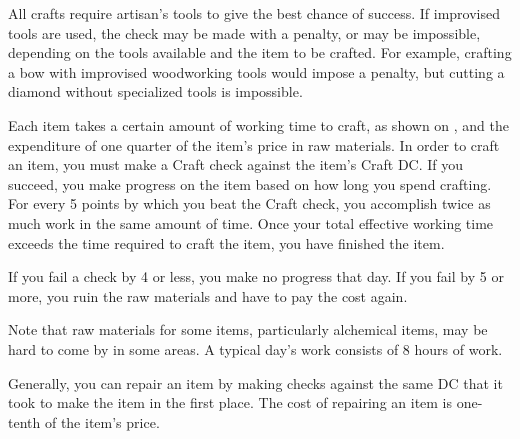 All crafts require artisan's tools to give the best chance of success. If improvised tools are used, the check may be made with a penalty, or may be impossible, depending on the tools available and the item to be crafted. For example, crafting a bow with improvised woodworking tools would impose a  penalty, but cutting a diamond without specialized tools is impossible.

\begin{comment}
To determine the time required to craft an item, consult the table below.
\begin{dtable*}
  \lcaption{Crafting Time}
  \begin{tabularx}{\columnwidth}{l X}
    \thead{Item Price} & \thead{Crafting Time} \\
    1gp or less & 1 hour per sp (minimum 1 hour) \\
    10gp or less & 1 day per 2 gp (minimum 1 day) \\
    100gp or less & 5 days \add 1 day per 4 gp \\
    1000gp or less & 30 days \add 1 day per 100 gp \\
  \end{tabularx}
\end{dtable*}
\end{comment}

Each item takes a certain amount of working time to craft, as shown on , and the expenditure of one quarter of the item's price in raw materials. In order to craft an item, you must make a Craft check against the item's Craft DC. If you succeed, you make progress on the item based on how long you spend crafting. For every 5 points by which you beat the Craft check, you accomplish twice as much work in the same amount of time. Once your total effective working time exceeds the time required to craft the item, you have finished the item.

If you fail a check by 4 or less, you make no progress that day. If you fail by 5 or more, you ruin the raw materials and have to pay the cost again.

Note that raw materials for some items, particularly alchemical items, may be hard to come by in some areas. A typical day's work consists of 8 hours of work.

 Generally, you can repair an item by making checks against the same DC that it took to make the item in the first place. The cost of repairing an item is one-tenth of the item's price.

